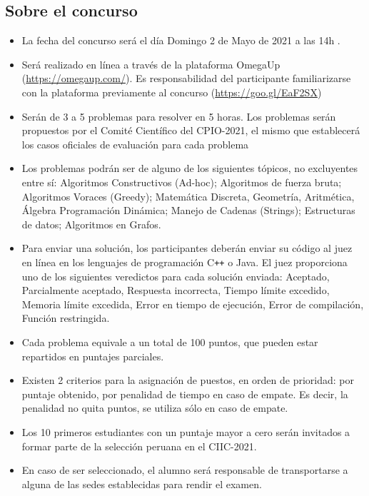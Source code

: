 \documentclass{article}
\begin{document}
\subsection{Sobre el concurso}

\begin{itemize}
    \item La fecha del concurso será el día {\color{red} Domingo 2 de Mayo de 2021 a las 14h} . 

    
      \item Será realizado en línea a través de la plataforma OmegaUp (\url{https://omegaup.com/}).
    Es responsabilidad del participante familiarizarse con la plataforma previamente al concurso (\url{https://goo.gl/EaF2SX})
    
   \item Serán de 3 a 5 problemas para resolver en 5 horas.
   Los problemas serán propuestos por el Comité Científico del CPIO-2021, el mismo que establecerá los casos oficiales de evaluación para cada problema
   
    \item Los problemas podrán ser de alguno de los siguientes tópicos, no excluyentes entre sí:
Algoritmos Constructivos (Ad-hoc);
Algoritmos de fuerza bruta;
Algoritmos Voraces (Greedy);
Matemática Discreta,
Geometría, Aritmética, Álgebra
Programación Dinámica;
Manejo de Cadenas (Strings);
Estructuras de datos;
Algoritmos en Grafos.

 \item 
 Para enviar una solución, los participantes deberán enviar su código al juez en línea en los lenguajes de programación C\texttt{++}  o Java.
El juez proporciona uno de los siguientes veredictos para cada solución enviada:
Aceptado,
Parcialmente aceptado,
Respuesta incorrecta,
Tiempo límite excedido,
Memoria límite excedida,
Error en tiempo de ejecución,
Error de compilación,
Función restringida.

\item

Cada problema equivale a un total de 100 puntos, que pueden estar repartidos en puntajes parciales.

 \item 
Existen 2 criterios para la asignación de puestos, en orden de prioridad: por puntaje obtenido, por penalidad de tiempo en caso de empate.
Es decir, la penalidad no quita puntos, se utiliza sólo en caso de empate.

 \item 
Los 10 primeros estudiantes con un puntaje mayor a cero serán invitados a formar parte de la selección peruana en el CIIC-2021.

 \item 
En caso de ser seleccionado, el alumno será responsable de transportarse a alguna de las sedes establecidas para rendir el examen.
 
\end{itemize}
\end{document}
